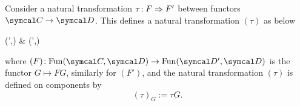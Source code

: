\begin{lemma}
	Consider a natural transformation \( \tau\!:F\Rightarrow F' \) between functors \(\calC\to\calD\). This defines a natural transformation \((\tau)\) as below
	\begin{diagram*}
		\Fun(\calD',\calC) \ar[r,bend left,"(F)",""{name=A,below}]\ar[r,bend right,"(F')"',""{name=B,above}] & \Fun(\calD',\calD)\ar[from=A,to=B,Rightarrow,"(\tau)"]
	\end{diagram*}
	where \((F)\!:\Fun(\calC,\calD)\to\Fun(\calD',\calD)\) is the functor \(G\mapsto FG\), similarly for \((F')\), and the natural transformation \((\tau)\) is defined on components by
	\[ (\tau)_G := \tau G. \]
\end{lemma}
